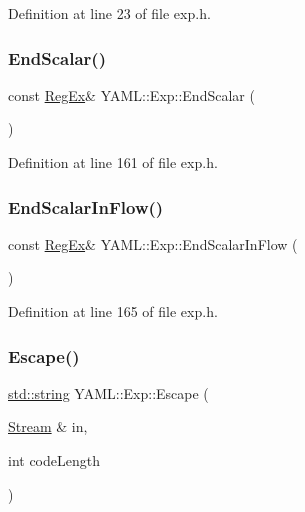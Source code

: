 Definition at line 23 of file exp.\+h.

\mbox{\label{namespace_y_a_m_l_1_1_exp_a2ac2c0875035b421788e9799f8b75ed7}} 
\subsubsection{\texorpdfstring{EndScalar()}{EndScalar()}}
{\footnotesize\ttfamily const \mbox{\hyperlink{class_y_a_m_l_1_1_reg_ex}{Reg\+Ex}}\& Y\+A\+M\+L\+::\+Exp\+::\+End\+Scalar (\begin{DoxyParamCaption}{ }\end{DoxyParamCaption})\hspace{0.3cm}{\ttfamily [inline]}}



Definition at line 161 of file exp.\+h.

\mbox{\label{namespace_y_a_m_l_1_1_exp_aaa8f952eabc0b7cc8cccfe03ab563ce5}} 
\subsubsection{\texorpdfstring{EndScalarInFlow()}{EndScalarInFlow()}}
{\footnotesize\ttfamily const \mbox{\hyperlink{class_y_a_m_l_1_1_reg_ex}{Reg\+Ex}}\& Y\+A\+M\+L\+::\+Exp\+::\+End\+Scalar\+In\+Flow (\begin{DoxyParamCaption}{ }\end{DoxyParamCaption})\hspace{0.3cm}{\ttfamily [inline]}}



Definition at line 165 of file exp.\+h.

\mbox{\label{namespace_y_a_m_l_1_1_exp_aa0420fb20a465d5981e56a271e16b58e}} 
\subsubsection{\texorpdfstring{Escape()}{Escape()}\hspace{0.1cm}{\footnotesize\ttfamily [1/2]}}
{\footnotesize\ttfamily \mbox{\hyperlink{glad_8h_ac83513893df92266f79a515488701770}{std\+::string}} Y\+A\+M\+L\+::\+Exp\+::\+Escape (\begin{DoxyParamCaption}\item[{\mbox{\hyperlink{class_y_a_m_l_1_1_stream}{Stream}} \&}]{in,  }\item[{int}]{code\+Length }\end{DoxyParamCaption})}



